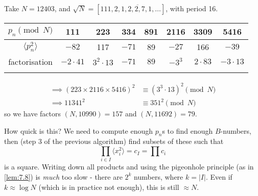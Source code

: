 \documentclass{article}
\newcommand{\cmark}{\ding{51}}
\begin{document}
\begin{eg}
    Take $N=12403$, and $\sqrt{N} = [111, \overline{2, 1, 2, 2, 7, 1, \dotsc}]$, with period 16.
    \def\arraystretch{1.5}
    \begin{center}
        \begin{tabular}{c|ccccccc}
            $p_n \pmod{N}$ & 111 & 223 & 334 & 891 & 2116 & 3309 & 5416 \\
            \hline
            $\langle p_n^2 \rangle$ & $-82$ & 117 & $-71$ & 89 & $-27$ & 166 & $-39$ \\
            factorisation & $-2\cdot41$ & $3^2 \cdot 13$ & $-71$ & $89$ & $-3^3$ & $2 \cdot 83$ & $-3 \cdot 13$ \\
                          &             & \cmark         &       &      & \cmark &              & \cmark
        \end{tabular}
    \end{center}
    \begin{align*}
        \implies (223 \times 2116 \times 5416)^2 &\equiv (3^3 \cdot 13)^2 \pmod{N} \\
        \implies 11341^2 &\equiv 351^2 \pmod{N}
    \end{align*}
    so we have factors $(N, 10990) = 157$ and $(N, 11692) = 79$.
\end{eg}
How quick is this?
We need to compute enough $p_n$s to find enough $B$-numbers, then (step 3 of the previous algorithm) find subsets of these such that
\begin{equation*}
    \prod_{i \in I} \langle x_i^2 \rangle = c_I = \prod c_i
\end{equation*}
is a square.
Writing down all products and using the pigeonhole principle (as in \cref{lem:7.8}) is \textit{much} too slow - there are $2^k$ numbers, where $k = |I|$.
Even if $k \approx \log N$ (which is in practice not enough), this is still $\approx N$.
\end{document}
